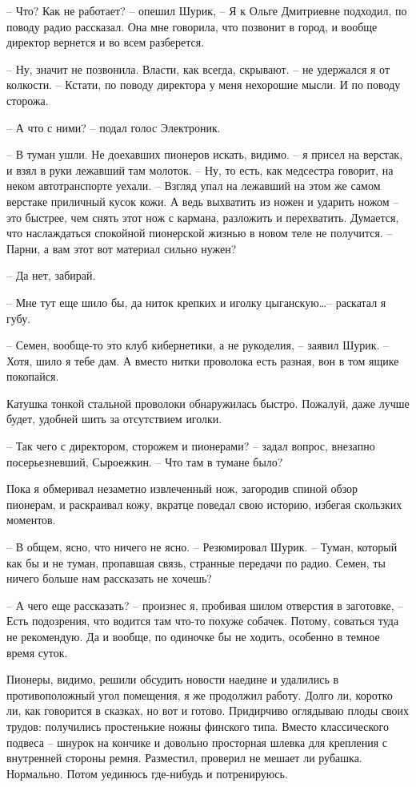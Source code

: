 \documentclass[a4paper]{book}
\begin{document}
-- Что? Как не работает? -- опешил Шурик, -- Я к Ольге Дмитриевне подходил, по поводу радио рассказал. Она мне говорила, что позвонит в город, и вообще директор вернется и во всем разберется. 

-- Ну, значит не позвонила. Власти, как всегда, скрывают. -- не удержался я от колкости. -- Кстати, по поводу директора у меня нехорошие мысли. И по поводу сторожа. 

-- А что с ними? -- подал голос Электроник.

-- В туман ушли. Не доехавших пионеров искать, видимо. -- я присел на верстак, и взял в руки лежавший там молоток. -- Ну, то есть, как медсестра говорит, на неком автотранспорте уехали. -- Взгляд упал на лежавший на этом же самом верстаке приличный кусок кожи. А ведь выхватить из ножен и ударить ножом -- это быстрее, чем снять этот нож с кармана, разложить и перехватить. Думается, что наслаждаться спокойной пионерской жизнью в новом теле не получится. -- Парни, а вам этот вот материал сильно нужен? 

-- Да нет, забирай. 

-- Мне тут еще шило бы, да ниток крепких и иголку цыганскую\ldots -- раскатал я губу.

-- Семен, вообще-то это клуб кибернетики, а не рукоделия, -- заявил Шурик. -- Хотя, шило я тебе дам. А вместо нитки проволока есть разная, вон в том ящике покопайся.

Катушка тонкой стальной проволоки обнаружилась быстро. Пожалуй, даже лучше будет, удобней шить за отсутствием иголки. 

-- Так чего с директором, сторожем и пионерами? -- задал вопрос, внезапно посерьезневший, Сыроежкин. -- Что там в тумане было?

Пока я обмеривал незаметно извлеченный нож, загородив спиной обзор пионерам, и раскраивал кожу, вкратце поведал свою историю, избегая скользких моментов. 

-- В общем, ясно, что ничего не ясно. -- Резюмировал Шурик. -- Туман, который как бы и не туман, пропавшая связь, странные передачи по радио. Семен, ты ничего больше нам рассказать не хочешь?

-- А чего еще рассказать? -- произнес я, пробивая шилом отверстия в заготовке, -- Есть подозрения, что водится там что-то похуже собачек. Потому, соваться туда не рекомендую. Да и вообще, по одиночке бы не ходить, особенно в темное время суток. 

Пионеры, видимо, решили обсудить новости наедине и удалились в противоположный угол помещения, я же продолжил работу. Долго ли, коротко ли, как говорится в сказках, но вот и готово. Придирчиво оглядываю плоды своих трудов: получились простенькие ножны финского типа. Вместо классического подвеса --  шнурок  на кончике и довольно просторная шлевка для крепления с внутренней стороны ремня. Разместил, проверил не мешает ли рубашка. Нормально. Потом уединюсь где-нибудь и потренируюсь.
\end{document}
